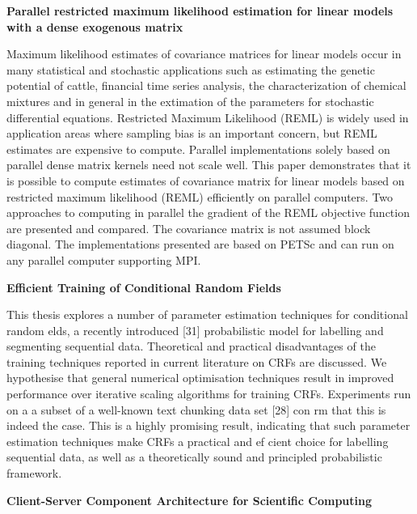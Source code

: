 \documentclass[11pt]{article}
\begin{document}
\bigskip
\noindent
\textbf{Parallel restricted maximum likelihood estimation for linear 
    models with a dense exogenous matrix}
\cite{malard02parallel}

\noindent
Maximum likelihood estimates of covariance matrices for linear models
occur in many statistical and stochastic applications such as
estimating the genetic potential of cattle, financial time series
analysis, the characterization of chemical mixtures and in general in
the extimation of the parameters for stochastic differential
equations.  Restricted Maximum Likelihood (REML) is widely used in
application areas where sampling bias is an important concern, but
REML estimates are expensive to compute.  Parallel implementations
solely based on parallel dense matrix kernels need not scale well.
This paper demonstrates that it is possible to compute estimates of
covariance matrix for linear models based on restricted maximum
likelihood (REML) efficiently on parallel computers.  Two approaches
to computing in parallel the gradient of the REML objective function
are presented and compared.  The covariance matrix is not assumed
block diagonal.  The implementations presented are based on PETSc and
can run on any parallel computer supporting MPI.

\bigskip
\noindent
\textbf{Efficient Training of Conditional Random Fields}
\cite{wallach}

\noindent
This thesis explores a number of parameter estimation techniques for
conditional random  elds, a recently introduced [31] probabilistic
model for labelling and segmenting sequential data. Theoretical and
practical disadvantages of the training techniques reported in current
literature on CRFs are discussed. We hypothesise that general
numerical optimisation techniques result in improved performance over
iterative scaling algorithms for training CRFs. Experiments run on a a
subset of a well-known text chunking data set [28] con rm that this is
indeed the case. This is a highly promising result, indicating that
such parameter estimation techniques make CRFs a practical and ef
cient choice for labelling sequential data, as well as a theoretically
sound and principled probabilistic framework.



\bigskip
\noindent
\textbf{Client-Server Component Architecture for Scientific Computing}
\cite{dajani}
\end{document}
